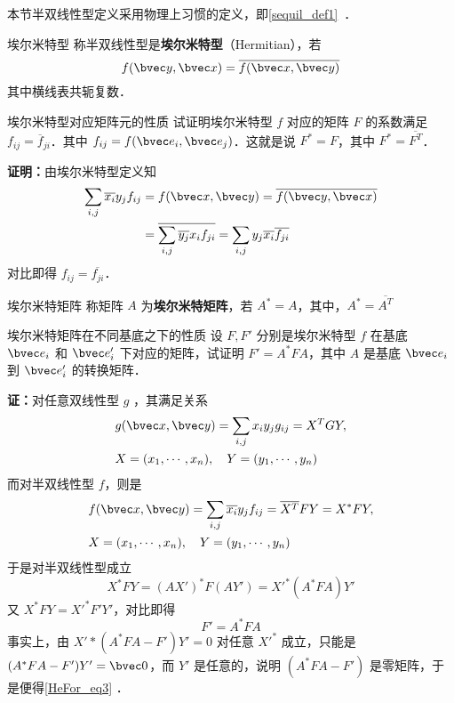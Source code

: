 本节半双线性型定义采用物理上习惯的定义，即\autoref{sequil_def1}~．
\begin{definition}{埃尔米特型}
称半双线性型是\textbf{埃尔米特型}（Hermitian），若
\begin{equation}\label{HeFor_eq2}
f(\bvec y,\bvec x)=\overline{f(\bvec x,\bvec y)}
\end{equation}
其中横线表共轭复数．
\end{definition}
\begin{example}{埃尔米特型对应矩阵元的性质}
试证明埃尔米特型 $f$ 对应的矩阵 $F$ 的系数满足 $f_{ij}=\overline f_{ji}$．其中 $f_{ij}=f(\bvec e_i,\bvec e_j)$．这就是说 $F^*=F$，其中 $F^*=\overline {F^T}$．

\textbf{证明：}由埃尔米特型定义知
\begin{equation}
\begin{aligned}
\sum_{i,j}\overline{x_i}y_j f_{ij}&=f(\bvec x,\bvec y)=\overline{f(\bvec y,\bvec x)}\\
&=\overline{\sum_{i,j}\overline{y_j} x_i f_{ji}}=\sum_{i,j}y_j\overline{x_i}\overline{f_{ji}}
\end{aligned}
\end{equation}
对比即得 $f_{ij}=\overline{f_{ji}}$．
\end{example}
\begin{definition}{埃尔米特矩阵}
称矩阵 $A$ 为\textbf{埃尔米特矩阵}，若 $A^*=A$，其中，$A^*=\overline{A^T}$
\end{definition}
\begin{example}{埃尔米特矩阵在不同基底之下的性质}
设 $F,F'$ 分别是埃尔米特型 $f$ 在基底 $\bvec e_i$ 和 $\bvec e'_i$ 下对应的矩阵，试证明 $F'=A^*FA$，其中 $A$ 是基底 $\bvec e_i$ 到 $\bvec e'_i$ 的转换矩阵．

\textbf{证：}对任意双线性型 $g$ ，其满足关系
\begin{equation}
\begin{aligned}
&g(\bvec x,\bvec y)=\sum_{i,j}x_i y_j g_{ij}=X^TGY,\\
&X=(x_1,\cdots,x_n),\quad Y=(y_1,\cdots,y_n)
\end{aligned}
\end{equation}
而对半双线性型 $f$，则是
\begin{equation}\label{HeFor_eq1}
\begin{aligned}
&f(\bvec x,\bvec y)=\sum_{i,j}\overline{x_i} y_j f_{ij}=\overline{X^T}FY=X^*FY,\\
&X=(x_1,\cdots,x_n),\quad Y=(y_1,\cdots,y_n)
\end{aligned}
\end{equation}
于是对半双线性型成立
\begin{equation}
X^*FY=(AX')^*F(AY')={X'}^*(A^*FA)Y'
\end{equation}
又 $X^* F Y=X'^* F'Y'$，对比即得
\begin{equation}\label{HeFor_eq3}
F'=A^*F A
\end{equation}
事实上，由 ${X'}*(A^*FA-F')Y'=0$ 对任意 $X'^*$ 成立，只能是 $(A^*FA-F')Y'=\bvec 0$，而 $Y'$ 是任意的，说明 $(A^*FA-F')$ 是零矩阵，于是便得\autoref{HeFor_eq3} ．
\end{example}
